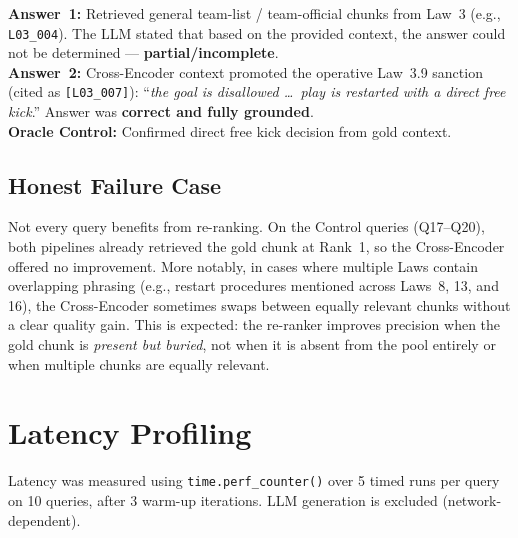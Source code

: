 \documentclass[11pt,a4paper]{article}
\begin{document}
\begin{description}[style=nextline, leftmargin=1.5em]
\item[\textbf{Q13 --- Buried Chunk (Extra Person When Goal Scored)}]
\textbf{Answer~1:} Retrieved general team-list / team-official chunks from
Law~3 (e.g., \texttt{L03\_004}).  The LLM stated that based on the provided context,
the answer could not be determined --- \textbf{partial/incomplete}.\\
\textbf{Answer~2:} Cross-Encoder context promoted the operative Law~3.9 sanction (cited as \texttt{[L03\_007]}):
``\emph{the goal is disallowed \ldots\ play is restarted with a direct free kick}.''
Answer was \textbf{correct and fully grounded}.\\
\textbf{Oracle Control:} Confirmed direct free kick decision from gold context.

\end{description}

\subsection{Honest Failure Case}

Not every query benefits from re-ranking.  On the Control queries (Q17--Q20),
both pipelines already retrieved the gold chunk at Rank~1, so the
Cross-Encoder offered no improvement.  More notably, in cases where multiple
Laws contain overlapping phrasing (e.g., restart procedures mentioned across
Laws~8, 13, and 16), the Cross-Encoder sometimes swaps between equally
relevant chunks without a clear quality gain.  This is expected: the
re-ranker improves precision when the gold chunk is \emph{present but buried},
not when it is absent from the pool entirely or when multiple chunks are
equally relevant.


\section{Latency Profiling}
\label{sec:latency}

Latency was measured using \texttt{time.perf\_counter()} over 5 timed runs per
query on 10 queries, after 3 warm-up iterations.  LLM generation is excluded
(network-dependent).
\end{document}

